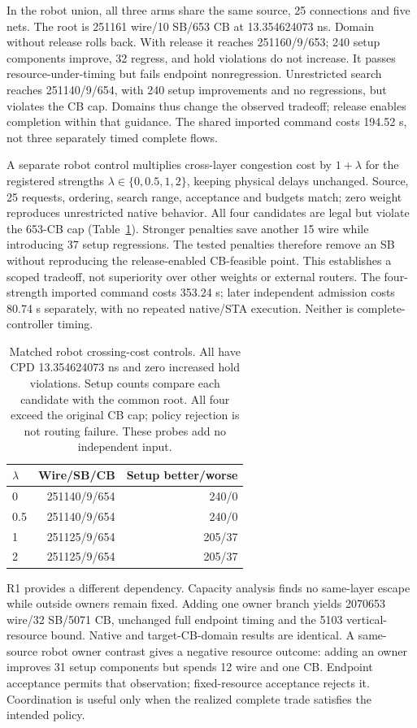 \documentclass[conference,10pt]{IEEEtran}
\begin{document}
In the robot union, all three arms share the same source, 25 connections and five nets. The root is 251161 wire/10 SB/653 CB at 13.354624073 ns. Domain without release rolls back. With release it reaches 251160/9/653; 240 setup components improve, 32 regress, and hold violations do not increase. It passes resource-under-timing but fails endpoint nonregression. Unrestricted search reaches 251140/9/654, with 240 setup improvements and no regressions, but violates the CB cap. Domains thus change the observed tradeoff; release enables completion within that guidance. The shared imported command costs 194.52 s, not three separately timed complete flows.

A separate robot control multiplies cross-layer congestion cost by $1+\lambda$ for the registered strengths $\lambda\in\{0,0.5,1,2\}$, keeping physical delays unchanged. Source, 25 requests, ordering, search range, acceptance and budgets match; zero weight reproduces unrestricted native behavior. All four candidates are legal but violate the 653-CB cap (Table~\ref{tab:costcontrol}). Stronger penalties save another 15 wire while introducing 37 setup regressions. The tested penalties therefore remove an SB without reproducing the release-enabled CB-feasible point. This establishes a scoped tradeoff, not superiority over other weights or external routers. The four-strength imported command costs 353.24 s; later independent admission costs 80.74 s separately, with no repeated native/STA execution. Neither is complete-controller timing.

\begin{table}[t]
\centering\footnotesize\setlength{\tabcolsep}{4pt}
\caption{Matched robot crossing-cost controls. All have CPD 13.354624073 ns and zero increased hold violations. Setup counts compare each candidate with the common root. All four exceed the original CB cap; policy rejection is not routing failure. These probes add no independent input.}
\label{tab:costcontrol}
\begin{tabular}{lrr}\hline
$\lambda$ & Wire/SB/CB & Setup better/worse\\\hline
0 & 251140/9/654 & 240/0\\
0.5 & 251140/9/654 & 240/0\\
1 & 251125/9/654 & 205/37\\
2 & 251125/9/654 & 205/37\\\hline
\end{tabular}
\end{table}

R1 provides a different dependency. Capacity analysis finds no same-layer escape while outside owners remain fixed. Adding one owner branch yields 2070653 wire/32 SB/5071 CB, unchanged full endpoint timing and the 5103 vertical-resource bound. Native and target-CB-domain results are identical. A same-source robot owner contrast gives a negative resource outcome: adding an owner improves 31 setup components but spends 12 wire and one CB. Endpoint acceptance permits that observation; fixed-resource acceptance rejects it. Coordination is useful only when the realized complete trade satisfies the intended policy.
\end{document}
